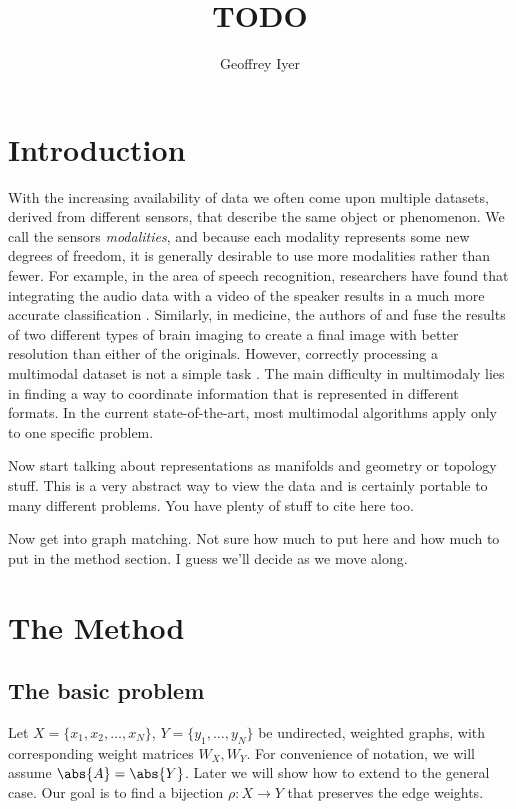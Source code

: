 \message{ !name(Research_Statement.tex)}\documentclass{article}[11pt]
\title{\vspace{-3cm}TODO\vspace{-0.3cm}}
\author{Geoffrey Iyer} \date{}
\begin{document}

\maketitle

\section{Introduction}
\label{sec:intro}

With the increasing availability of data we often come upon multiple
datasets, derived from different sensors, that describe the same object or
phenomenon. We call the sensors \emph{modalities}, and because each
modality represents some new degrees of freedom, it is generally desirable
to use more modalities rather than fewer. For example, in the area of
speech recognition, researchers have found that integrating the audio data
with a video of the speaker results in a much more accurate classification
\cite{Potamianos03, sedighin:hal-01400542}. Similarly, in medicine, the
authors of \cite{Lei12} and \cite{Samadi2016} fuse the results of two
different types of brain imaging to create a final image with better
resolution than either of the originals. However, correctly processing a multimodal dataset is not a simple task \cite{lahat:hal-01062366}. The main difficulty in multimodaly lies in finding a way to coordinate information that is represented in different formats. In the current state-of-the-art, most multimodal algorithms apply only to one specific problem. 

Now start talking about representations as manifolds and geometry or topology stuff. This is a very abstract way to view the data and is certainly portable to many different problems. You have plenty of stuff to cite here too.

Now get into graph matching. Not sure how much to put here and how much to put in the method section. I guess we'll decide as we move along.

\section{The Method}
\label{sec:method}

\subsection{The basic problem}
Let $X = \{x_1,x_2,\ldots,x_N\}$, $Y = \{y_1,\ldots,y_N\}$ be undirected, weighted graphs, with corresponding weight matrices $W_X,W_Y$. For convenience of notation, we will assume $\abs{A} = \abs{Y}$. Later we will show how to extend to the general case. Our goal is to find a bijection $\rho: X\to Y$ that preserves the edge weights. 
\end{document}
